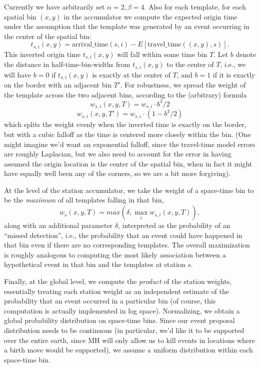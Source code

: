 \documentclass{article}
\begin{document}
Currently we have arbitrarily set $\alpha = 2, \beta=4$. Also for each template, for each spatial bin $(x,y)$ in the accumulator we compute the expected origin time under the assumption that the template was generated by an event occurring in the center of the spatial bin:
\[t_{s,i}(x,y) = \text{arrival\_time}(s, i) - E[\text{travel\_time}((x,y), s)].\]
This inverted origin time $t_{s,i}(x,y)$ will fall within some time bin $T$. Let $b$ denote the distance in half-time-bin-widths from $t_{s,i}(x,y)$ to the center of $T$, i.e., we will have $b=0$ if $t_{s,i}(x,y)$ is exactly at the center of $T$, and $b=1$ if it is exactly on the border with an adjacent bin $T'$. For robustness, we spread the weight of the template across the two adjacent bins, according to the (arbitrary) formula
\[w_{s,i}(x, y, T) = w_{s,i} \cdot b^3/2\]
\[w_{s,i}(x, y, T') = w_{s,i} \cdot (1 - b^3/2)\]
which splits the weight evenly when the inverted time is exactly on the border, but with a cubic falloff as the time is centered more closely within the bin. (One might imagine we'd want an exponential falloff, since the travel-time model errors are roughly Laplacian, but we also need to account for the error in having assumed the origin location is the center of the spatial bin, when in fact it might have equally well been any of the corners, so we are a bit more forgiving). 

At the level of the station accumulator, we take the weight of a space-time bin to be the {\em maximum} of all templates falling in that bin,
\[w_{s}(x,y,T) = max(\delta, \max_i w_{s,i}(x,y,T)),\]
along with an additional parameter $\delta$, interpreted as the probability of an ``missed detection'', i.e., the probability that an event could have happened in that bin even if there are no corresponding templates. The overall maximization is roughly analogous to computing the most likely association between a hypothetical event in that bin and the templates at station $s$. 

Finally, at the global level, we compute the {\em product} of the station weights, essentially treating each station weight as an independent estimate of the probability that an event occurred in a particular bin (of course, this computation is actually implemented in log space). Normalizing, we obtain a global probability distribution on space-time bins. Since our event proposal distribution needs to be continuous (in particular, we'd like it to be supported over the entire earth, since MH will only allow us to kill events in locations where a birth move would be supported), we assume a uniform distribution within each space-time bin. 
\end{document}
